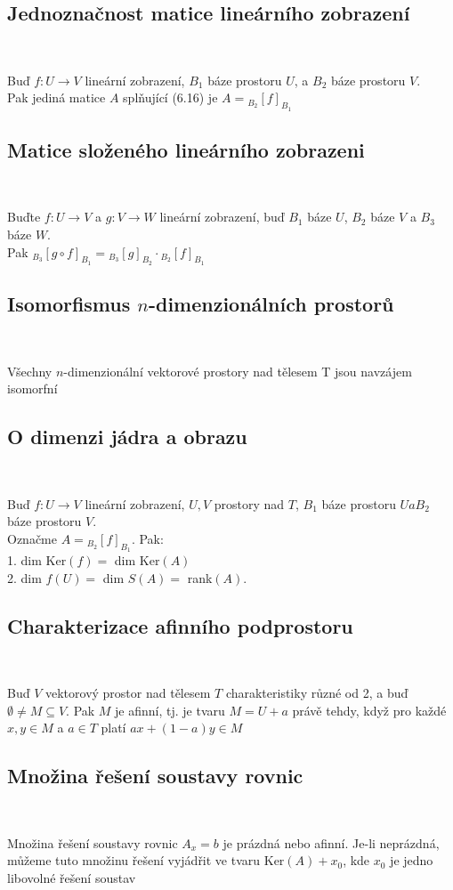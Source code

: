 \documentclass[a4paper]{article}
\newcommand{\asubsection}[3]{
	\setcounter{section}{#1}
	\setcounter{subsection}{#2}
	\addtocounter{subsection}{-1}
	\subsection{#3}~
}
\begin{document}
\asubsection{6}{18}{Jednoznačnost matice lineárního zobrazení}
Buď $f : U \rightarrow V$ lineární zobrazení,
$B_1$ báze prostoru $U$, a $B_2$ báze prostoru $V$. \\
Pak jediná matice $A$ splňující (6.16) je $A = {}_{B_2}[f]_{B_1}$


\asubsection{6}{24}{Matice složeného lineárního zobrazeni}
Buďte $f : U \rightarrow V$ a $g : V \rightarrow W$ lineární zobrazení,
buď $B_1$ báze $U$, $B_2$ báze $V$ a $B_3$ báze $W$. \\
Pak $ {}_{B_3}[g \circ f]_{B_1} = {}_{B_3}[g]_{B_2} \cdot {}_{B_2}[f]_{B_1}$


\asubsection{6}{35}{Isomorfismus $n$-dimenzionálních prostorů}
Všechny $n$-dimenzionální vektorové prostory nad tělesem T jsou navzájem isomorfní


\asubsection{6}{37}{O dimenzi jádra a obrazu}
Buď $f : U \rightarrow V$ lineární zobrazení,
$U, V$ prostory nad $T$, $B_1$ báze prostoru $U a B_2$ báze prostoru $V$. \\
Označme $A = {}_{B_2}[f]_{B_1}$.
Pak: \\
1. dim Ker$(f) = $ dim Ker$(A)$ \\
2. dim $f(U) = $ dim $S(A) = $ rank$(A)$.


\asubsection{7}{4}{Charakterizace afinního podprostoru}
Buď $V$ vektorový prostor nad tělesem $T$ charakteristiky různé od 2,
a buď $\emptyset \neq M \subseteq V$.
Pak $M$ je afinní, tj. je tvaru $M = U + a$ právě tehdy, když pro každé
$x, y \in M$ a $a \in T$ platí $ax + (1 - a)y \in M$

\asubsection{7}{5}{Množina řešení soustavy rovnic}
Množina řešení soustavy rovnic $A_x = b$ je prázdná nebo afinní.
Je-li neprázdná, můžeme tuto množinu řešení vyjádřit ve
tvaru Ker$(A) + x_0$, kde $x_0$ je jedno libovolné řešení soustav
\end{document}
